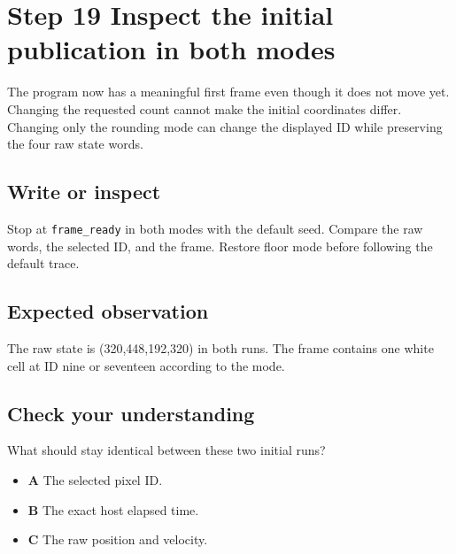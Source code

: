 \section{Step 19 Inspect the initial publication in both modes}\label{ball-s19}

The program now has a meaningful first frame even though it does not move yet. Changing the requested count cannot make the initial coordinates differ. Changing only the rounding mode can change the displayed ID while preserving the four raw state words.

\subsection{Write or inspect}
Stop at \texttt{frame\_ready} in both modes with the default seed. Compare the raw words, the selected ID, and the frame. Restore floor mode before following the default trace.

\subsection{Expected observation}
The raw state is (320,448,192,320) in both runs. The frame contains one white cell at ID nine or seventeen according to the mode.

\subsection{Check your understanding}
What should stay identical between these two initial runs?

\begin{itemize}
  \item \textbf{A} The selected pixel ID.
  \item \textbf{B} The exact host elapsed time.
  \item \textbf{C} The raw position and velocity.
\end{itemize}
